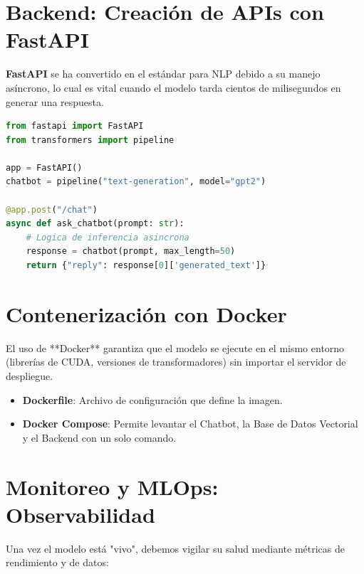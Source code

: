 \documentclass[12pt,a4paper,openany,oneside]{book}
\begin{document}
\section{Backend: Creación de APIs con FastAPI}

\textbf{FastAPI} se ha convertido en el estándar para NLP debido a su manejo asíncrono, lo cual es vital cuando el modelo tarda cientos de milisegundos en generar una respuesta.

\begin{lstlisting}[language=Python, caption=Ejemplo de API básica para Chatbot]
from fastapi import FastAPI
from transformers import pipeline

app = FastAPI()
chatbot = pipeline("text-generation", model="gpt2")

@app.post("/chat")
async def ask_chatbot(prompt: str):
    # Logica de inferencia asincrona
    response = chatbot(prompt, max_length=50)
    return {"reply": response[0]['generated_text']}
\end{lstlisting}

\section{Contenerización con Docker}

El uso de **Docker** garantiza que el modelo se ejecute en el mismo entorno (librerías de CUDA, versiones de transformadores) sin importar el servidor de despliegue.

\begin{itemize}
    \item \textbf{Dockerfile}: Archivo de configuración que define la imagen.
    \item \textbf{Docker Compose}: Permite levantar el Chatbot, la Base de Datos Vectorial y el Backend con un solo comando.
\end{itemize}

\section{Monitoreo y MLOps: Observabilidad}

Una vez el modelo está "vivo", debemos vigilar su salud mediante métricas de rendimiento y de datos:
\end{document}

